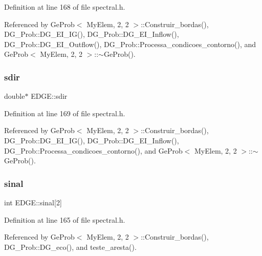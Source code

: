 Definition at line 168 of file spectral.\+h.



Referenced by Ge\+Prob$<$ My\+Elem, 2, 2 $>$\+::\+Construir\+\_\+bordas(), D\+G\+\_\+\+Prob\+::\+D\+G\+\_\+\+E\+I\+\_\+\+I\+G(), D\+G\+\_\+\+Prob\+::\+D\+G\+\_\+\+E\+I\+\_\+\+Inflow(), D\+G\+\_\+\+Prob\+::\+D\+G\+\_\+\+E\+I\+\_\+\+Outflow(), D\+G\+\_\+\+Prob\+::\+Processa\+\_\+condicoes\+\_\+contorno(), and Ge\+Prob$<$ My\+Elem, 2, 2 $>$\+::$\sim$\+Ge\+Prob().

\mbox{\label{structEDGE_a1d4086d11f2d42029de2bf64e8624eff}} 
\subsubsection{\texorpdfstring{sdir}{sdir}}
{\footnotesize\ttfamily double$\ast$ E\+D\+G\+E\+::sdir}



Definition at line 169 of file spectral.\+h.



Referenced by Ge\+Prob$<$ My\+Elem, 2, 2 $>$\+::\+Construir\+\_\+bordas(), D\+G\+\_\+\+Prob\+::\+D\+G\+\_\+\+E\+I\+\_\+\+I\+G(), D\+G\+\_\+\+Prob\+::\+D\+G\+\_\+\+E\+I\+\_\+\+Inflow(), D\+G\+\_\+\+Prob\+::\+Processa\+\_\+condicoes\+\_\+contorno(), and Ge\+Prob$<$ My\+Elem, 2, 2 $>$\+::$\sim$\+Ge\+Prob().

\mbox{\label{structEDGE_a7f3d4b5d4f9959c2814157d3f5c8a72a}} 
\subsubsection{\texorpdfstring{sinal}{sinal}}
{\footnotesize\ttfamily int E\+D\+G\+E\+::sinal\mbox{[}2\mbox{]}}



Definition at line 165 of file spectral.\+h.



Referenced by Ge\+Prob$<$ My\+Elem, 2, 2 $>$\+::\+Construir\+\_\+bordas(), D\+G\+\_\+\+Prob\+::\+D\+G\+\_\+eco(), and teste\+\_\+aresta().

\mbox{\label{structEDGE_ae66eecd49a3fc1c8910631431925d5a4}} 

